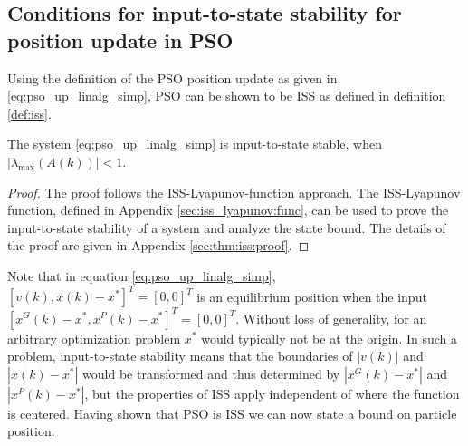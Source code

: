 
\subsection{Conditions for input-to-state stability for position update in PSO}
\label{sec:iss_conditions}

Using the definition of the PSO position update as given in \eqref{eq:pso_up_linalg_simp}, PSO can be shown to be ISS as defined in definition \ref{def:iss}.

\begin{mythm}
\label{thm:iss}
The system \eqref{eq:pso_up_linalg_simp} is input-to-state stable, when $ | \lambda_{\max} ( A(k) ) | < 1 $.
\begin{proof}
The proof follows the ISS-Lyapunov-function approach. 
The ISS-Lyapunov function, defined in Appendix \ref{sec:iss_lyapunov:func}, can be used to prove the input-to-state stability of a system and analyze the state bound\cite{Jiang2001857}.
The details of the proof are given in Appendix \ref{sec:thm:iss:proof}.
\end{proof}
\end{mythm}

Note that in equation \eqref{eq:pso_up_linalg_simp},
$ [ v(k), x(k) - x^{*} ]^{T} = [0, 0]^{T} $ is an equilibrium position when the input $ [ x^{G}(k) - x^{*} , x^{P}(k) - x^{*} ]^{T} = [0, 0]^{T} $.
Without loss of generality, for an arbitrary optimization problem $ x^{*} $ would typically not be at the origin. 
In such a problem, input-to-state stability means that the boundaries of $ | v(k) | $ and $ | x(k) - x^{*} | $ would be transformed and thus determined by $ | x^{G}(k) - x^{*} | $ and $ | x^{P}(k) - x^{*} | $,
but the properties of ISS apply independent of where the function is centered.
Having shown that PSO is ISS we can now state a bound on particle position.

